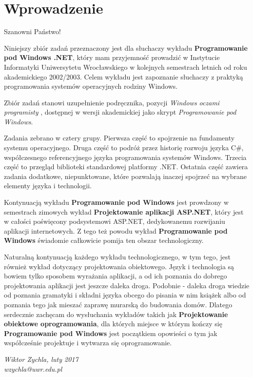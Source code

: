 ﻿\chapter*{Wprowadzenie}

Szanowni Państwo!

Niniejszy zbiór zadań przeznaczony jest dla słuchaczy wykładu
{\bf Programowanie pod Windows .NET}, który mam przyjemność prowadzić 
w Instytucie Informatyki Uniwersytetu Wrocławskiego w kolejnych semestrach letnich
od roku akademickiego 2002/2003.
Celem wykładu jest zapoznanie słuchaczy z praktyką programowania systemów operacyjnych rodziny Windows.

Zbiór zadań stanowi uzupełnienie podręcznika,
pozycji {\em Windows oczami programisty} \cite{WZWOP}, 
dostępnej w wersji akademickiej jako skrypt {\em Programowanie pod Windows}.

Zadania zebrano w cztery grupy. Pierwsza część to spojrzenie na fundamenty systemu operacyjnego. 
Druga część to podróż przez historię rozwoju języka C\#, współczesnego referencyjnego języka programowania systemów Windows.
Trzecia część to przegląd biblioteki standardowej platformy .NET. Ostatnia część zawiera zadania dodatkowe, niepunktowane, które pozwalają 
inaczej spojrzeć na wybrane elementy języka i technologii.

Kontynuacją wykładu {\bf Programowanie pod Windows} jest prowdzony w semestrach zimowych
wykład {\bf Projektowanie aplikacji ASP.NET}, który jest 
w całości poświęcony podsystemowi ASP.NET, dedykowanemu rozwijaniu aplikacji internetowych. Z tego też powodu wykład 
{\bf Programowanie pod Windows} świadomie całkowicie pomija ten obszar technologiczny.

Naturalną kontynuacją każdego wykładu technologicznego, w tym tego, jest również wykład dotyczący projektowania obiektowego. Język i technologia są
bowiem tylko sposobem wyrażania aplikacji, a od ich poznania do dobrego projektowania aplikacji jest jeszcze daleka droga. Podobnie -
daleka droga wiedzie od poznania gramatyki i składni języka obcego do pisania w nim książek albo od poznania tego jak mieszać zaprawę murarską do budowania domów.
Dlatego serdecznie zachęcam do wysłuchania wykładów takich jak {\bf Projektowanie obiektowe oprogramowania}, dla których miejsce w którym kończy się {\bf Programowanie pod Windows} jest 
początkiem opowieści o tym jak współcześnie projektuje i wytwarza się oprogramowanie.

\vspace{1cm}
\hfill{\em Wiktor Zychla, luty 2017}\\
\vspace{1cm}
\hfill{\em wzychla@uwr.edu.pl}

